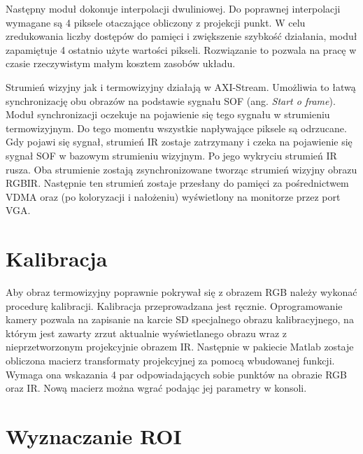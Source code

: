 Następny moduł dokonuje interpolacji dwuliniowej. 
Do poprawnej interpolacji wymagane są 4 piksele otaczające obliczony z projekcji punkt. 
W celu zredukowania liczby dostępów do pamięci i zwiększenie szybkość działania, moduł zapamiętuje 4 ostatnio użyte wartości pikseli. 
Rozwiązanie to pozwala na pracę w czasie rzeczywistym małym kosztem zasobów układu.

Strumień wizyjny jak i termowizyjny działają w AXI-Stream. %
Umożliwia to łatwą synchronizację obu obrazów na podstawie sygnału SOF (ang. \textit{Start o frame}). 
Moduł synchronizacji oczekuje na pojawienie się tego sygnału w strumieniu termowizyjnym. 
Do tego momentu wszystkie napływające piksele są odrzucane. 
Gdy pojawi się sygnał, strumień IR zostaje zatrzymany i czeka na pojawienie się sygnał SOF w bazowym strumieniu wizyjnym. 
Po jego wykryciu strumień IR rusza. %
Oba strumienie zostają zsynchronizowane tworząc strumień wizyjny obrazu RGBIR. 
Następnie ten strumień zostaje przesłany do pamięci za pośrednictwem VDMA oraz (po koloryzacji i nałożeniu) wyświetlony na monitorze przez port VGA.

\section{Kalibracja}

Aby obraz termowizyjny poprawnie pokrywał się z obrazem RGB należy wykonać procedurę kalibracji. 
Kalibracja przeprowadzana jest ręcznie. 
Oprogramowanie kamery pozwala na zapisanie na karcie SD specjalnego obrazu kalibracyjnego, na którym jest zawarty zrzut aktualnie wyświetlanego obrazu wraz z nieprzetworzonym projekcyjnie obrazem IR. %
Następnie w pakiecie Matlab zostaje obliczona macierz transformaty projekcyjnej za pomocą wbudowanej funkcji. 
Wymaga ona wskazania 4 par odpowiadających sobie punktów na obrazie RGB oraz IR. 
Nową macierz można wgrać podając jej parametry w konsoli. 



\section{Wyznaczanie ROI}

